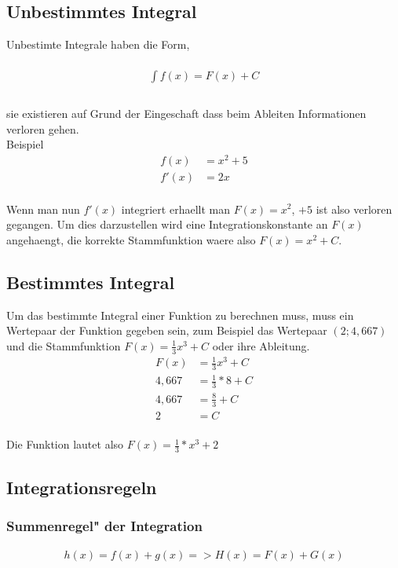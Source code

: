 \documentclass[a4paper]{article} %
\begin{document}
	\subsection{Unbestimmtes Integral}
	Unbestimte Integrale haben die Form,\\\\
	\begin{align*}
	\int f(x)=F(x)+C\\
	\end{align*}\\
	sie existieren auf Grund der Eingeschaft dass beim Ableiten Informationen verloren gehen.\\
	Beispiel\\
	\begin{align*}
	f(x) & =x^2+5\\
	f'(x) & =2x
	\end{align*}\\
	Wenn man nun $f'(x)$ integriert erhaellt man $F(x) =x^2$, $+5$ ist also verloren gegangen.
	Um dies darzustellen wird eine Integrationskonstante an $F(x)$ angehaengt, die korrekte Stammfunktion waere also $F(x)=x^2+C$.
	\subsection{Bestimmtes Integral}
	Um das bestimmte Integral einer Funktion zu berechnen muss, muss ein Wertepaar der Funktion gegeben sein, zum Beispiel
	das Wertepaar $(2;4,667)$ und die Stammfunktion $F(x)=\frac{1}{3}x^3+C$ oder ihre Ableitung.\\
	\begin{align*}
	F(x) & =\frac{1}{3}x^3+C\\
	4,667 &= \frac{1}{3}*8+C\\
	4,667 &= \frac{8}{3}+C\\
	2 & =C
	\end{align*}\\
	Die Funktion lautet also $F(x)=\frac{1}{3}*x^3+2$
	\subsection{Integrationsregeln}
	\subsubsection{Summenregel" der Integration}

	\begin{align*}
	h(x)=f(x)+g(x)=>H(x)= F(x)+ G(x)
	\end{align*}
\end{document}
